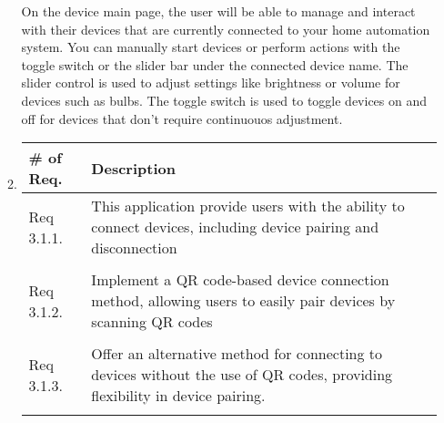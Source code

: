 \begin{enumerate}[label=\arabic*.]
\begin{enumerate}[label=\alph*]
                        On the device main page, the user will be able to manage and interact with their devices that are currently connected to your home automation system. You can manually start devices or perform actions with the toggle switch or the slider bar under the connected device name. The slider control is used to adjust settings like brightness or volume for devices such as bulbs. The toggle switch is used to toggle devices on and off for devices that don't require continuouos adjustment.  \\
              \item
              \begin{table}[H]
                        \center
                        \begin{tabular}{m{1.4cm} m{5.5cm}}
                            \toprule
                            \# of Req. & Description                                                                                                                   \\
                            \midrule
                            Req 3.1.1.   & This application provide users with the ability to connect devices, including device pairing and disconnection \\\\
                            Req 3.1.2.   & Implement a QR code-based device connection method, allowing users to easily pair devices by scanning QR codes                     \\\\
                            Req 3.1.3.   &Offer an alternative method for connecting to devices without the use of QR codes, providing flexibility in device pairing. \\\\
                            \bottomrule
                        \end{tabular}
                    \end{table}
                

\end{enumerate}
\end{enumerate}
